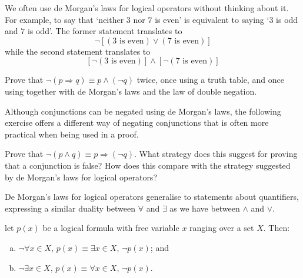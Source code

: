 \begin{example}
We often use de Morgan's laws for logical operators without thinking about it. For example, to say that `neither $3$ nor $7$ is even' is equivalent to saying `$3$ is odd and $7$ is odd'. The former statement translates to
\[ \neg [(3 \text{ is even}) \vee (7 \text{ is even})]\]
while the second statement translates to
\[ [\neg (3 \text{ is even})] \wedge [\neg (7 \text{ is even})]\]
\end{example}

\begin{exercise}
\label{exNegationOfImplication}
Prove that $\neg (p \Rightarrow q) \equiv p \wedge (\neg q)$ twice, once using a truth table, and once using  together with de Morgan's laws and the law of double negation.
\end{exercise}

Although conjunctions can be negated using de Morgan's laws, the following exercise offers a different way of negating conjunctions that is often more practical when being used in a proof.

\begin{exercise}
\label{exNegationOfConjunctionAlternative}
Prove that $\neg (p \wedge q) \equiv p \Rightarrow (\neg q)$. What strategy does this suggest for proving that a conjunction is false? How does this compare with the strategy suggested by de Morgan's laws for logical operators?
\end{exercise}

De Morgan's laws for logical operators generalise to statements about quantifiers, expressing a similar duality between $\forall$ and $\exists$ as we have between $\wedge$ and $\vee$.

\begin{theorem}
\label{thmDeMorganQuantifiers}
let $p(x)$ be a logical formula with free variable $x$ ranging over a set $X$. Then:
\begin{enumerate}[(a)]
\item $\neg \forall x \in X,\, p(x) \equiv \exists x \in X,\, \neg p(x)$; and
\item $\neg \exists x \in X,\, p(x) \equiv \forall x \in X,\, \neg p(x)$.
\end{enumerate}
\end{theorem}

